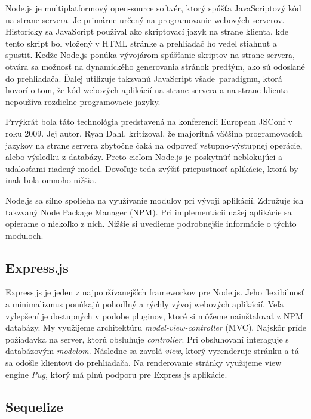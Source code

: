 Node.js je multiplatformový open-source softvér, ktorý spúšťa JavaScriptový
kód na strane servera. Je primárne určený na programovanie webových serverov.
Historicky sa JavaScript používal ako skriptovací jazyk
na strane klienta, kde tento skript bol vložený v HTML stránke a prehliadač ho vedel
stiahnuť a spustiť. Keďže Node.js ponúka vývojárom spúšťanie skriptov na strane servera,
otvára sa možnosť na dynamického generovania stránok predtým, ako sú odoslané do
prehliadača. Ďalej utilizuje takzvanú \glqq JavaScript všade\grqq~paradigmu, ktorá
hovorí o tom, že kód webových aplikácií na strane servera a na strane klienta nepoužíva rozdielne programovacie jazyky.~\cite{bib:nodejs}

Prvýkrát bola táto technológia predstavená na konferencii European JSConf v roku 2009.
Jej autor, Ryan Dahl, kritizoval, že majoritná väčšina programovacích jazykov
na strane servera zbytočne čaká na odpoveď vstupno-výstupnej operácie, alebo
výsledku z databázy. Preto cieľom Node.js je poskytnúť neblokujúci a udalosťami
riadený model. Dovoľuje teda zvýšiť priepustnosť aplikácie, ktorá by inak bola omnoho
nižšia.

Node.js sa silno spolieha na využívanie modulov pri vývoji aplikácií. Združuje
ich takzvaný Node Package Manager (NPM). Pri implementácii našej aplikácie sa opierame
o niekoľko z nich. Nižšie si uvedieme podrobnejšie informácie o týchto moduloch. \cite{bib:crawford2017comparison}

\subsection{Express.js}
\label{sec:nodejs:expressjs}

Express.js je jeden z najpoužívanejších frameworkov pre Node.js. Jeho flexibilnosť
a minimalizmus ponúkajú pohodlný a rýchly vývoj webových aplikácií.
Veľa vylepšení je dostupných v podobe pluginov, ktoré si môžeme nainštalovať z NPM
databázy. My využijeme architektúru \textit{model-view-controller} (MVC). Najskôr príde
požiadavka na server, ktorú obsluhuje \textit{controller}. Pri obsluhovaní
interaguje s databázovým \textit{modelom}. Následne sa zavolá \textit{view}, ktorý 
vyrenderuje stránku a tá sa odošle klientovi do prehliadača. Na renderovanie
stránky využijeme view engine \textit{Pug}, ktorý má plnú podporu pre Express.js
aplikácie.

\subsection{Sequelize}
\label{sec:nodejs:sequelize}

